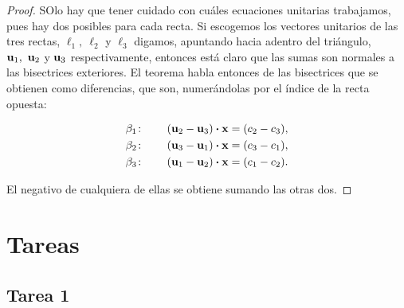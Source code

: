 \documentclass{article}
\theoremstyle{definicion}
\theoremstyle{definition}             %
\theoremstyle{definition}             %
\theoremstyle{definition}
\theoremstyle{definition}
\theoremstyle{observacion}
\theoremstyle{definition}
\theoremstyle{plain}
\theoremstyle{definition}
\theoremstyle{afirmacion}
\theoremstyle{notation}
\theoremstyle{definition}
\begin{document}
        \begin{proof}
            SOlo hay que tener cuidado con cuáles ecuaciones unitarias trabajamos, pues hay dos posibles para cada recta. Si escogemos los vectores unitarios de las tres rectas, \(\ell_{1},\ \ell_{2}\) y \(\ell_{3}\) digamos, apuntando hacia adentro del triángulo, \(\vb{u}_{1},\ \vb{u}_{2}\) y \(\vb{u}_{3}\) respectivamente, entonces está claro que las sumas son normales a las bisectrices exteriores. El teorema habla entonces de las bisectrices que se obtienen como diferencias, que son, numerándolas por el índice de la recta opuesta:

            \begin{align*}
                \beta_{1} \colon \qquad (\vb{u}_{2} - \vb{u}_{3}) \vdot \vb{x} &= (c_{2} - c_{3}),\\
                \beta_{2} \colon \qquad (\vb{u}_{3} - \vb{u}_{1}) \vdot \vb{x} &= (c_{3} - c_{1}),\\
                \beta_{3} \colon \qquad (\vb{u}_{1} - \vb{u}_{2}) \vdot \vb{x} &= (c_{1} - c_{2}).
            \end{align*}

            El negativo de cualquiera de ellas se obtiene sumando las otras dos.
        \end{proof}

        \section{Tareas}

        \subsection{Tarea 1}
\end{document}
